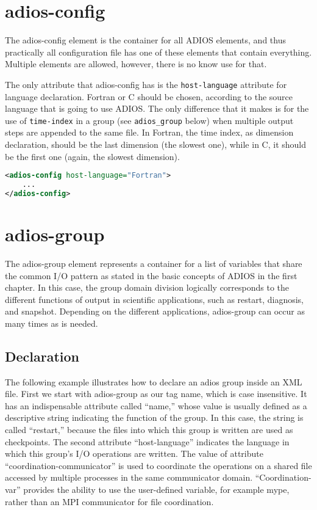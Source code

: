 \section{adios-config}
The adios-config element is the container for all ADIOS elements, and thus practically
all configuration file has one of these elements that contain everything. Multiple 
elements are allowed, however, there is no know use for that. 

The only attribute that adios-config has is the \verb+host-language+ attribute for 
language declaration. Fortran or C should be chosen, according to the source 
language that is going to use ADIOS. The only difference that it makes is for
the use of \verb+time-index+ in a group (see \verb+adios_group+ below) when multiple output 
steps are appended to the
same file. In Fortran, the time index, as dimension declaration, should be the last
dimension (the slowest one), while in C, it should be the first one (again, the slowest
dimension).

\begin{lstlisting}[language=XML]
<adios-config host-language="Fortran">
    ...
</adios-config>
\end{lstlisting}


\section{adios-group}
The adios-group element represents a container for a list of variables that share 
the common I/O pattern as stated in the basic concepts of ADIOS in the first chapter. 
In this case, the group domain division logically corresponds to the different 
functions of output in scientific applications, such as restart, diagnosis, and 
snapshot. Depending on the different applications, adios-group can occur as many 
times as is needed.

\subsection{Declaration}

The following example illustrates how to declare an adios group inside an XML file. 
First we start with adios-group as our tag name, which is case insensitive. It 
has an indispensable attribute called ``name,'' whose value is usually defined 
as a descriptive string indicating the function of the group. In this case, the 
string is called ``restart,'' because the files into which this group is written 
are used as checkpoints. The second attribute ``host-language'' indicates the language 
in which this group's I/O operations are written. The value of attribute ``coordination-communicator'' 
is used to coordinate the operations on a shared file accessed by multiple processes 
in the same communicator domain. ``Coordination-var'' provides the ability to use 
the user-defined variable, for example mype, rather than an MPI communicator for 
file coordination. 

